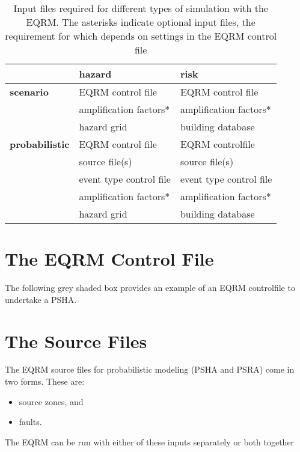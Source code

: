 \begin{table}
\caption{Input files required for different types of simulation with
the EQRM. The asterisks indicate optional input files, the
requirement for which depends on settings in the EQRM control file}
\label{tab:input-overview} \centering
\begin{tabular}{|l|l|l|}
\hline
 & \textbf{hazard} & \textbf{risk} \\
\hline
\textbf{scenario} & EQRM control file & EQRM control file \\
  & amplification factors* & amplification factors* \\
  & hazard grid & building database \\
\hline
\textbf{probabilistic} & EQRM control file & EQRM controlfile\\
  & source file(s) & source file(s) \\
  & event type control file & event type control file \\
  & amplification factors* & amplification factors* \\
  & hazard grid & building database \\
\hline
\end{tabular}
\end{table}

\section{The EQRM Control File}
\label{sec:application-EQRMcf}




\clearpage The following grey shaded box provides an
example of an EQRM controlfile to undertake a PSHA.




\clearpage
\section{The Source Files}

The EQRM source files for probabilistic modeling (PSHA and PSRA)
come in two forms. These are:
\begin{itemize}
\item source zones, and
\item faults.
\end{itemize}
The EQRM can be run with either of these inputs separately or both
together


